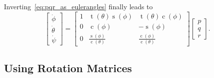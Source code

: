\documentclass[10pt,a4paper,fleqn]{article}
\newcommand{\ssin}[0]{\operatorname{s}}
\newcommand{\scos}[0]{\operatorname{c}}
\newcommand{\stan}[0]{\operatorname{t}}
\newcommand{\bVec}[1]{\mathbf{#1}}
\newcommand{\vect}[3]{{_{\mathsmaller{\mathrm{#2}}}\mathbf{#1}_{\mathsmaller{\mathrm{#3}}}}} %
\newcommand{\ori}[1]{\bVec{R}_{\!\mathsmaller{\mathrm{#1}}}} %
\begin{document}
%
Inverting~\eqref{eq:pqr_as_eulerangles} finally leads to 
%
\begin{equation}
\begin{bmatrix}
	\dot{\phi} \\ \dot{\theta} \\ \dot{\psi} 
\end{bmatrix} 
 =
\begin{bmatrix} 1 & \stan(\theta)\ssin(\phi) & \stan(\theta)\scos(\phi) \\ 0 & \scos(\phi) & -\ssin(\phi) \\ 0 & \frac{\ssin(\phi)}{\scos(\theta)}  & \frac{\scos(\phi)}{\scos(\theta)} \end{bmatrix}
\begin{bmatrix}
	p \\ q \\ r 
\end{bmatrix} .     
\end{equation}






%

\subsection{Using Rotation Matrices}\label{sec:dynamicsrotmat}
\end{document}
